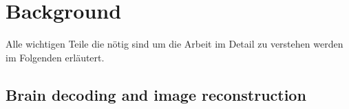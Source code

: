 \chapter{Background}

Alle wichtigen Teile die nötig sind um die Arbeit im Detail zu verstehen werden im Folgenden erläutert. 

\section{Brain decoding and image reconstruction}





